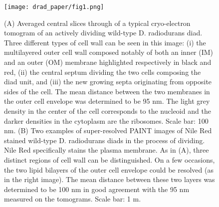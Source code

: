 \begin{figure}[ht]
    \centering
    \texttt{[image: drad\_paper/fig1.png]}
    \caption[Structures of exponentially growing D. radiodurans cell walls during the process of cell division]{(A) Averaged central slices through of a typical cryo-electron tomogram of an actively dividing wild-type D. radiodurans diad. Three different types of cell wall can be seen in this image: (i) the multilayered outer cell wall composed notably of both an inner (IM) and an outer (OM) membrane highlighted respectively in black and red, (ii) the central septum dividing the two cells composing the diad unit, and (iii) the new growing septa originating from opposite sides of the cell. The mean distance between the two membranes in the outer cell envelope was determined to be 95 nm. The light grey density in the center of the cell corresponds to the nucleoid and the darker densities in the cytoplasm are the ribosomes. Scale bar: 100 nm. (B) Two examples of super-resolved PAINT images of Nile Red stained wild-type D. radiodurans diads in the process of dividing. Nile Red specifically stains the plasma membrane. As in (A), three distinct regions of cell wall can be distinguished. On a few occasions, the two lipid bilayers of the outer cell envelope could be resolved (as in the right image). The mean distance between these two layers was determined to be 100 nm in good agreement with the 95 nm measured on the tomograms. Scale bar: 1 \mu{}m.}
    \label{drad_fig1}
\end{figure}


